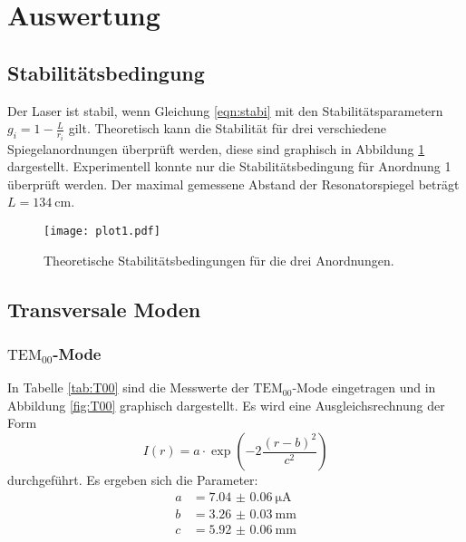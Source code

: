 \section{Auswertung}
\label{sec:Auswertung}

\subsection{Stabilitätsbedingung}
\label{sec:stab}

Der Laser ist stabil, wenn Gleichung \eqref{eqn:stabi} mit den Stabilitätsparametern $g_i =1-\frac{L}{r_i}$ gilt.
Theoretisch kann die Stabilität für drei verschiedene Spiegelanordnungen überprüft werden, diese sind graphisch in Abbildung \ref{fig:plot1} dargestellt.
Experimentell konnte nur die Stabilitätsbedingung für Anordnung 1 überprüft werden.
Der maximal gemessene Abstand der Resonatorspiegel beträgt $L = \SI{134}{\centi\meter}$.

\begin{figure}
  \centering
  \texttt{[image: plot1.pdf]}
  \caption{Theoretische Stabilitätsbedingungen für die drei Anordnungen.}
  \label{fig:plot1}
\end{figure}

\FloatBarrier
\subsection{Transversale Moden}
\label{sec:tem}

\subsubsection{$\text{TEM}_{00}$-Mode}

In Tabelle \ref{tab:T00} sind die Messwerte der $\text{TEM}_{00}$-Mode eingetragen und in Abbildung \ref{fig:T00} graphisch dargestellt.
Es wird eine Ausgleichsrechnung der Form
\begin{equation}
  I(r) = a \cdot \exp\left(-2\frac{(r-b)^2}{c^2}\right)
\end{equation}
durchgeführt.
Es ergeben sich die Parameter:
\begin{align*}
a &= \SI{7.04(6)}{\micro\ampere}\\
b &= \SI{3.26(3)}{\milli\metre}\\
c &= \SI{5.92(6)}{\milli\metre}
\end{align*}


